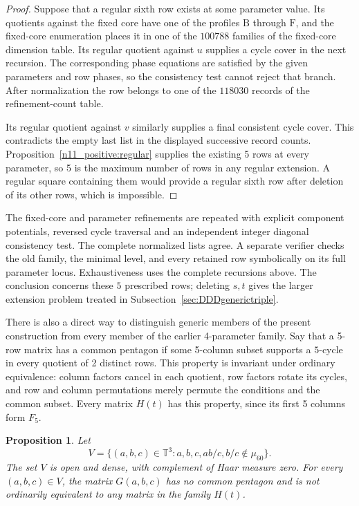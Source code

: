 \documentclass[11pt,a4paper]{article}
\newtheorem{proposition}[theorem]{Proposition}
\theoremstyle{plain}
\theoremstyle{definition}
\theoremstyle{plain}
\begin{document}
\begin{proof}
Suppose that a regular sixth row exists at some parameter value. Its quotients against the fixed core have one of the profiles $\mathrm{B}$ through $\mathrm{F}$, and the fixed-core enumeration places it in one of the $100788$ families of the fixed-core dimension table. Its regular quotient against $u$ supplies a cycle cover in the next recursion. The corresponding phase equations are satisfied by the given parameters and row phases, so the consistency test cannot reject that branch. After normalization the row belongs to one of the $118030$ records of the refinement-count table.

Its regular quotient against $v$ similarly supplies a final consistent cycle cover. This contradicts the empty last list in the displayed successive record counts. Proposition~\ref{n11_positive:regular} supplies the existing 5 rows at every parameter, so 5 is the maximum number of rows in any regular extension. A regular square containing them would provide a regular sixth row after deletion of its other rows, which is impossible.
\end{proof}

\medskip

The fixed-core and parameter refinements are repeated with explicit component potentials, reversed cycle traversal and an independent integer diagonal consistency test. The complete normalized lists agree. A separate verifier checks the old family, the minimal level, and every retained row symbolically on its full parameter locus. Exhaustiveness uses the complete recursions above. The conclusion concerns these $5$ prescribed rows; deleting $s,t$ gives the larger extension problem treated in Subsection~\ref{sec:DDDgenerictriple}.

\medskip
There is also a direct way to distinguish generic members of the present construction from every member of the earlier 4-parameter family. Say that a 5-row matrix has a common pentagon if some 5-column subset supports a $5$-cycle in every quotient of 2 distinct rows. This property is invariant under ordinary equivalence: column factors cancel in each quotient, row factors rotate its cycles, and row and column permutations merely permute the conditions and the common subset. Every matrix $H(t)$ has this property, since its first 5 columns form $F_5$.

\par\addvspace{\medskipamount}\noindent
\begin{minipage}{\linewidth}
\begin{proposition}\label{n11_positive:separation}
Let
$$V=\{(a,b,c)\in\mathbb T^3:
 a,b,c,ab/c,b/c\notin\mu_{60}\}.$$
The set $V$ is open and dense, with complement of Haar measure zero. For every $(a,b,c)\in V$, the matrix $G(a,b,c)$ has no common pentagon and is not ordinarily equivalent to any matrix in the family $H(t)$.
\end{proposition}
\end{minipage}
\par\addvspace{\medskipamount}
\end{document}

